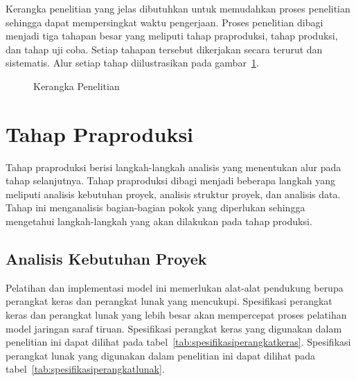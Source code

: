 Kerangka penelitian yang jelas dibutuhkan untuk memudahkan proses penelitian sehingga dapat
mempersingkat waktu pengerjaan. Proses penelitian dibagi menjadi tiga tahapan besar yang meliputi
tahap praproduksi, tahap produksi, dan tahap uji coba. Setiap tahapan tersebut dikerjakan secara
terurut dan sistematis. Alur setiap tahap diilustrasikan pada gambar~\ref{fig:kerangkapenelitian}.

\begin{figure}[htbp]
    \begin{center}
    \end{center}
    \vspace{-20pt}
    \captionsetup{labelfont=bf, textfont=bf}
    \caption{Kerangka Penelitian}
    \vspace{-10pt}
    \captionsetup{labelfont=md, textfont=md}
    \label{fig:kerangkapenelitian}
\end{figure}

\section{Tahap Praproduksi} \label{sec:3-TahapPraproduksi}

Tahap praproduksi berisi langkah-langkah analisis yang menentukan alur pada tahap selanjutnya. Tahap
praproduksi dibagi menjadi beberapa langkah yang meliputi analisis kebutuhan proyek, analisis
struktur proyek, dan analisis data. Tahap ini menganalisis bagian-bagian pokok yang diperlukan
sehingga mengetahui langkah-langkah yang akan dilakukan pada tahap produksi.

\subsection{Analisis Kebutuhan Proyek}

Pelatihan dan implementasi model ini memerlukan alat-alat pendukung berupa perangkat keras dan
perangkat lunak yang mencukupi. Spesifikasi perangkat keras dan perangkat lunak yang lebih besar
akan mempercepat proses pelatihan model jaringan saraf tiruan.
Spesifikasi perangkat keras yang digunakan dalam penelitian ini
dapat dilihat pada tabel~\ref{tab:spesifikasiperangkatkeras}. Spesifikasi perangkat lunak yang
digunakan dalam penelitian ini dapat dilihat pada tabel~\ref{tab:spesifikasiperangkatlunak}.


